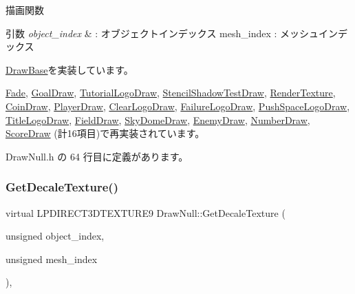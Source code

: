 描画関数 


\begin{DoxyParams}{引数}
{\em object\+\_\+index} & \+: オブジェクトインデックス mesh\+\_\+index \+: メッシュインデックス \\
\hline
\end{DoxyParams}


\mbox{\hyperlink{class_draw_base_a408080106630a1146d7af0bb46a4d8d1}{Draw\+Base}}を実装しています。



\mbox{\hyperlink{class_fade_a84a9e688650ac500e03cde74ff0210b8}{Fade}}, \mbox{\hyperlink{class_goal_draw_a554c826d7a4534ee489dfe18edf7ee0e}{Goal\+Draw}}, \mbox{\hyperlink{class_tutorial_logo_draw_aa808cfb8bc59d58bbd698a195603429f}{Tutorial\+Logo\+Draw}}, \mbox{\hyperlink{class_stencil_shadow_test_draw_abb5f9445b7d94c213a3751fa57e36643}{Stencil\+Shadow\+Test\+Draw}}, \mbox{\hyperlink{class_render_texture_a529ab829c676470ae5764b42cba9efb0}{Render\+Texture}}, \mbox{\hyperlink{class_coin_draw_ac7d91fecb6845cebe276eb81a4953563}{Coin\+Draw}}, \mbox{\hyperlink{class_player_draw_a8b9e8caa6bea7295f58a0aaddeb9458b}{Player\+Draw}}, \mbox{\hyperlink{class_clear_logo_draw_ab018f370071f370ae7016d8ee402c456}{Clear\+Logo\+Draw}}, \mbox{\hyperlink{class_failure_logo_draw_a8ee20e1697bbbaf7f41c18334830488a}{Failure\+Logo\+Draw}}, \mbox{\hyperlink{class_push_space_logo_draw_a647dddefc43d66cb3c720ee8fbb6a783}{Push\+Space\+Logo\+Draw}}, \mbox{\hyperlink{class_title_logo_draw_a01e4cb21d580bac86a226fa2e35bf4a3}{Title\+Logo\+Draw}}, \mbox{\hyperlink{class_field_draw_a1915497654d079074dbd3e058db06a78}{Field\+Draw}}, \mbox{\hyperlink{class_sky_dome_draw_a42364ea42618cbab588d55050edfe95a}{Sky\+Dome\+Draw}}, \mbox{\hyperlink{class_enemy_draw_a20a23c1c5fd5e510d15e8ca27aabd821}{Enemy\+Draw}}, \mbox{\hyperlink{class_number_draw_a15e4e602b3f9372349d0b6ff9e4fc423}{Number\+Draw}}, \mbox{\hyperlink{class_score_draw_a799e71943140a264cedba6002308b976}{Score\+Draw}} (計16項目)で再実装されています。



 Draw\+Null.\+h の 64 行目に定義があります。

\mbox{\label{class_draw_null_a8496ed1b1f765a331a8f1704122b8ca4}} 
\subsubsection{\texorpdfstring{Get\+Decale\+Texture()}{GetDecaleTexture()}}
{\footnotesize\ttfamily virtual L\+P\+D\+I\+R\+E\+C\+T3\+D\+T\+E\+X\+T\+U\+R\+E9 Draw\+Null\+::\+Get\+Decale\+Texture (\begin{DoxyParamCaption}\item[{unsigned}]{object\+\_\+index,  }\item[{unsigned}]{mesh\+\_\+index }\end{DoxyParamCaption})\hspace{0.3cm}{\ttfamily [inline]}, {\ttfamily [virtual]}}



